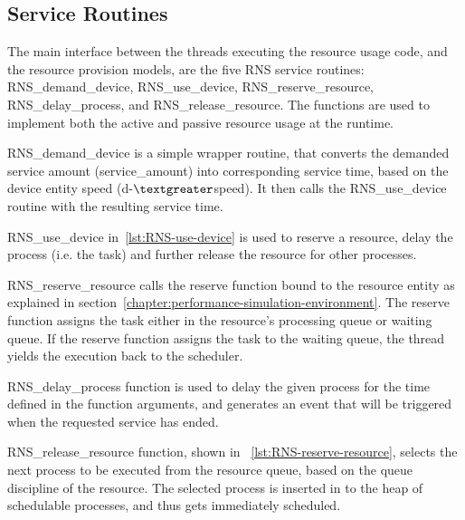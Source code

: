 \subsection{Service Routines}

The main interface between the threads executing the resource usage code, and the resource provision models, are the five RNS service routines: RNS\_demand\_device, RNS\_use\_device, RNS\_reserve\_resource, RNS\_delay\_process, and RNS\_release\_resource. The functions are used to implement both the active and passive resource usage at the runtime.

RNS\_demand\_device is a simple wrapper routine, that converts the demanded service amount (service\_amount) into corresponding service time, based on the device entity speed (d-$\textgreater$speed). It then calls the RNS\_use\_device routine with the resulting service time.

RNS\_use\_device in~\ref{lst:RNS-use-device} is used to reserve a resource, delay the process (i.e. the task) and further release the resource for other processes.

RNS\_reserve\_resource calls the reserve function bound to the resource entity as explained in section~\ref{chapter:performance-simulation-environment}. The reserve function assigns the task either in the resource's processing queue or waiting queue. If the reserve function assigns the task to the waiting queue, the thread yields the execution back to the scheduler.

RNS\_delay\_process function is used to delay the given process for the time defined in the function arguments, and generates an event that will be triggered when the requested service has ended.

RNS\_release\_resource function, shown in ~\ref{lst:RNS-reserve-resource}, selects the next process to be executed from the resource queue, based on the queue discipline of the resource. The selected process is inserted in to the heap of schedulable processes, and thus gets immediately scheduled.

